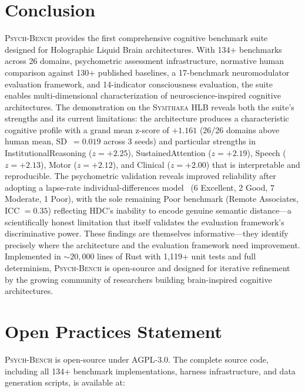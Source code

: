 \documentclass[11pt,letterpaper]{article}
\newcommand{\symthaea}{\textsc{Symthaea}}
\newcommand{\psychbench}{\textsc{Psych-Bench}}
\newcommand{\hlb}{\textsc{HLB}}
\begin{document}
\section{Conclusion}
\label{sec:conclusion}

\psychbench{} provides the first comprehensive cognitive benchmark suite designed for Holographic Liquid Brain architectures. With 134+ benchmarks across 26 domains, psychometric assessment infrastructure, normative human comparison against 130+ published baselines, a 17-benchmark neuromodulator evaluation framework, and 14-indicator consciousness evaluation, the suite enables multi-dimensional characterization of neuroscience-inspired cognitive architectures. The demonstration on the \symthaea{} \hlb{} reveals both the suite's strengths and its current limitations: the architecture produces a characteristic cognitive profile with a grand mean z-score of $+1.161$ (26/26 domains above human mean, SD~$= 0.019$ across 3 seeds) and particular strengths in InstitutionalReasoning ($z = +2.25$), SustainedAttention ($z = +2.19$), Speech ($z = +2.13$), Motor ($z = +2.12$), and Clinical ($z = +2.00$) that is interpretable and reproducible. The psychometric validation reveals improved reliability after adopting a lapse-rate individual-differences model~\citep{wichmann2001psychometric} (6 Excellent, 2 Good, 7 Moderate, 1 Poor), with the sole remaining Poor benchmark (Remote Associates, ICC $= 0.35$) reflecting HDC's inability to encode genuine semantic distance---a scientifically honest limitation that itself validates the evaluation framework's discriminative power. These findings are themselves informative---they identify precisely where the architecture and the evaluation framework need improvement. Implemented in ${\sim}20{,}000$ lines of Rust with 1,119+ unit tests and full determinism, \psychbench{} is open-source and designed for iterative refinement by the growing community of researchers building brain-inspired cognitive architectures.

\section*{Open Practices Statement}

\psychbench{} is open-source under AGPL-3.0. The complete source code, including all 134+ benchmark implementations, harness infrastructure, and data generation scripts, is available at:
\end{document}
